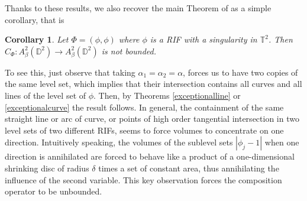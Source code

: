 \documentclass[12pt]{amsart}
\newtheorem{corollary}[theorem]{Corollary}
\numberwithin{equation}{section}
\begin{document}
Thanks to these results, we also recover the main Theorem of \cite{Me} as a simple corollary, that is
\begin{corollary}
    Let $\Phi=(\phi,\phi)$ where $\phi$ is a RIF with a singularity in $\mathbb{T}^2$. Then $C_{\Phi}:A^2_{\beta}(\mathbb{D}^2)\to A^2_{\beta}(\mathbb{D}^2)$ is not bounded.
\end{corollary}
To see this, just observe that taking $\alpha_1=\alpha_2=\alpha$, forces us to have two copies of the same level set, which implies that their intersection contains all curves and all lines of the level set of $\phi.$ Then, by Theorems \ref{exceptionalline} or \ref{exceptionalcurve} the result follows.
 In general, the containment of the same straight line or arc of curve, or points of high order tangential intersection in two level sets of two different RIFs, seems to force volumes to concentrate on one direction. Intuitively speaking, the volumes of the sublevel sets $|\phi_j-1|$ when one direction is annihilated are forced to behave like a product of a one-dimensional shrinking disc of radius $\delta$ times a set of constant area, thus annihilating the influence of the second variable. This key observation forces the composition operator to be unbounded.
 
\end{document}
